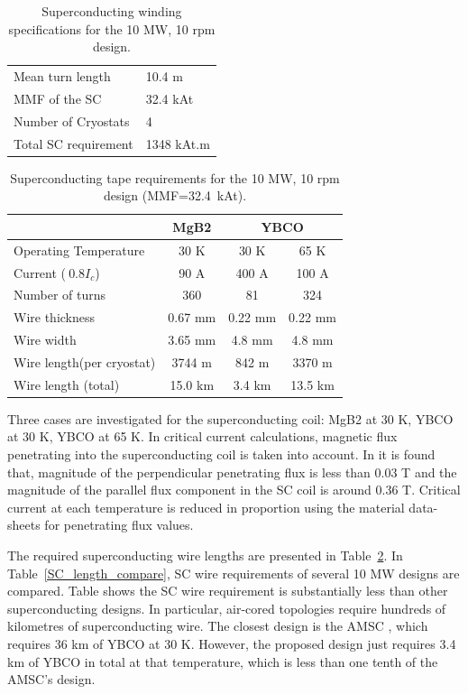 \documentclass[12pt]{iopart}
\begin{document}
\begin{table}[]
  \centering
  \begin{tabular}{ll}
\hline
Mean turn length & 10.4 m \\
MMF of the SC & 32.4 kAt \\
Number of Cryostats & 4 \\
Total SC requirement & 1348 kAt.m \\
\hline
 \end{tabular}
  \caption{Superconducting winding specifications for the 10 MW, 10 rpm design.}
  \label{10MW_hts_spec}
\end{table}

\begin{table}[t]
  \centering
  \begin{tabular}{lccc}
& MgB2 & \multicolumn{2}{c}{YBCO} \\
\hline
Operating Temperature & 30 K & 30 K & 65 K \\
Current ($~0.8I_c$) & 90 A & 400 A & 100 A \\
Number of turns & 360 & 81 & 324 \\
Wire thickness & 0.67 mm & 0.22 mm & 0.22 mm \\
Wire width & 3.65 mm & 4.8 mm & 4.8 mm \\
Wire length(per cryostat) & 3744 m & 842 m & 3370 m \\
Wire length (total) & 15.0 km & 3.4 km & 13.5 km \\
\hline
 \end{tabular}
  \caption{Superconducting tape requirements for the 10 MW, 10 rpm design (MMF=32.4~kAt).}
  \label{10MW_hts_wire_spec}
\end{table}

Three cases are investigated for the superconducting coil: MgB2 at 30 K, YBCO at 30 K, YBCO at 65 K. In critical current calculations, magnetic flux penetrating into the superconducting coil is taken into account. In \cite{Keysan2012a} it is found that, magnitude of the perpendicular penetrating flux is less than 0.03 T and the magnitude of the parallel flux component in the SC coil is around 0.36 T. Critical current at each temperature is reduced in proportion using the material data-sheets for penetrating flux values.

The required superconducting wire lengths are presented in Table~\ref{10MW_hts_wire_spec}. In Table~\ref{SC_length_compare}, SC wire requirements of several 10 MW designs are compared. Table shows the SC wire requirement is substantially less than other superconducting designs. In particular, air-cored topologies require hundreds of kilometres of superconducting wire. The closest design is the AMSC \cite{Snitchler2011}, which requires 36 km of YBCO at 30 K. However, the proposed design just requires 3.4 km of YBCO in total at that temperature, which is less than one tenth of the AMSC's design.
\end{document}

